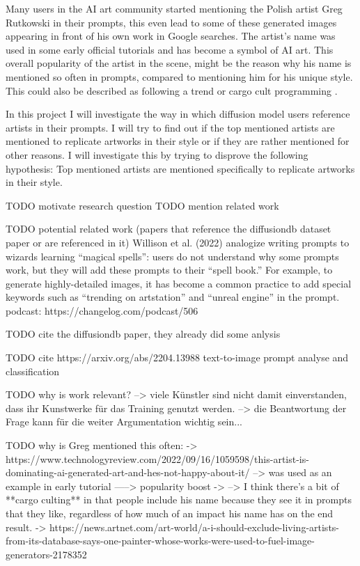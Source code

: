 Many users in the AI art community started mentioning the Polish artist Greg Rutkowski in their prompts, this even lead to some of these generated images appearing in front of his own work in Google searches. The artist's name was used in some early official tutorials and has become a symbol of AI art. This overall popularity of the artist in the scene, might be the reason why his name is mentioned so often in prompts, compared to mentioning him for his unique style. This could also be described as following a trend or cargo cult programming \autocite{ccp}.


In this project I will investigate the way in which diffusion model users reference artists in their prompts.
I will try to find out if the top mentioned artists are mentioned to replicate artworks in their style or if they are rather mentioned for other reasons.
I will investigate this by trying to disprove the following hypothesis:
Top mentioned artists are mentioned specifically to replicate artworks in their style.




TODO motivate research question
TODO mention related work

TODO potential related work (papers that reference the diffusiondb dataset paper or are referenced in it)
Willison et al. (2022) analogize writing prompts to wizards learning “magical spells”: users do not understand why some prompts work, but they will add these prompts to their “spell book.” For example, to generate highly-detailed images, it has become a common practice to add special keywords such as “trending on artstation” and “unreal engine” in the prompt.
podcast: https://changelog.com/podcast/506



TODO cite the diffusiondb paper, they already did some anlysis

TODO cite https://arxiv.org/abs/2204.13988 text-to-image prompt analyse and classification

TODO why is work relevant? 
--> viele Künstler sind nicht damit einverstanden, dass ihr Kunstwerke für das Training genutzt werden.
--> die Beantwortung der Frage kann für die weiter Argumentation wichtig sein...  

TODO why is Greg mentioned this often:
-> https://www.technologyreview.com/2022/09/16/1059598/this-artist-is-dominating-ai-generated-art-and-hes-not-happy-about-it/
--> was used as an example in early tutorial %
-----> popularity boost
-> %
--> I think there's a bit of **cargo culting** in that people include his name because they see it in prompts that they like, regardless of how much of an impact his name has on the end result.
-> https://news.artnet.com/art-world/a-i-should-exclude-living-artists-from-its-database-says-one-painter-whose-works-were-used-to-fuel-image-generators-2178352

